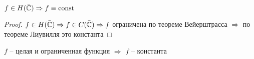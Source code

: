 \begin{theorem}[Лиувилля]\thmslashn
	
	$f \in H(\bar{\mathbb{C}}) \Rightarrow f \equiv \text{const}$
	
\end{theorem}

\begin{proof}\thmslashn
	
	$f \in H(\bar{\mathbb{C}}) \Rightarrow f\in C(\bar{\mathbb{C}}) \Rightarrow f$ ограничена по теореме Вейерштрасса $\Rightarrow$ по теореме Лиувилля это константа
	
\end{proof}

\begin{remark_author}\thmslashn
	
	\begin{theorem}[Лиувилля]\thmslashn
		
		$f$ -- целая и ограниченная функция $\Rightarrow$ $f$ -- константа
		
	\end{theorem}
	
\end{remark_author}
